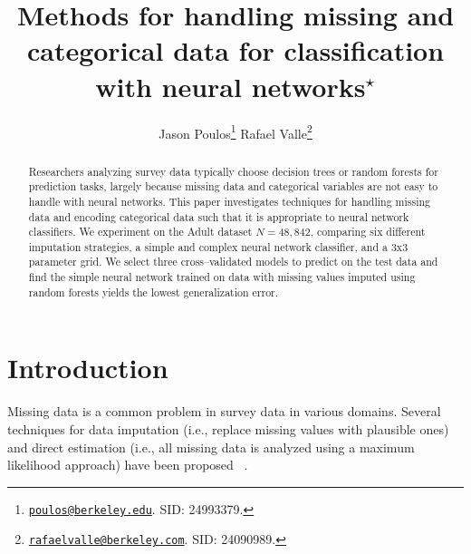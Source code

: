 \documentclass[10pt,twocolumn,letterpaper]{article}
\begin{document}
\title{Methods for handling missing and categorical data for classification with neural
networks$^\star$}

\author{
    Jason Poulos\thanks{\href{mailto:poulos@berkeley.edu}{\nolinkurl{poulos@berkeley.edu}}. SID: 24993379.}
    \hspace{10mm}
    Rafael Valle\thanks{\href{mailto:rafaelvalle@berkeley.com}{\nolinkurl{rafaelvalle@berkeley.com}}. SID: 24090989.}
    \vspace{15mm}
}

\maketitle

\begin{abstract}
Researchers analyzing survey data typically choose decision trees or random forests for prediction tasks, largely because missing data and categorical variables are not easy to handle with neural networks. This paper investigates techniques for handling missing data and encoding categorical data such that it is appropriate to neural network classifiers. We experiment on the Adult dataset $N=48,842$, comparing six different imputation strategies, a simple and complex neural network classifier, and a 3x3 parameter grid. We select three cross--validated models to predict on the test data and find the simple neural network trained on data with missing values imputed using random forests yields the lowest generalization error. 
\end{abstract}



\section{Introduction} \label{section:Intro}

Missing data is a common problem in survey data in various domains. Several
techniques for data imputation (i.e., replace missing values with plausible ones) and
direct estimation (i.e., all missing data is analyzed using a maximum likelihood
approach) have been proposed ~\cite{de2003prevention}. \\
\end{document}
